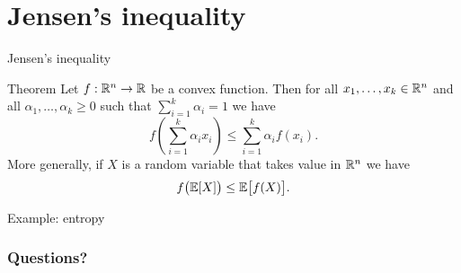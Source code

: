 \documentclass{beamer}
\begin{document}
\section{Jensen's inequality}


\begin{frame}[t]{Jensen's inequality}
	\grid

	\vspace{-0.4cm}

	\begin{block}{Theorem}
	Let $f: \mathbb{R}^n \to \mathbb{R}$ be a convex function. Then for all $x_1, \dots, x_k \in \mathbb{R}^n$ and all $\alpha_1, \dots, \alpha_k \geq 0$ such that $\sum_{i=1}^k \alpha_i = 1$ we have
	$$
	f\left(\sum_{i=1}^k \alpha_i x_i \right) \leq \sum_{i=1}^k \alpha_i f(x_i).
	$$
	More generally, if $X$ is a random variable that takes value in $\mathbb{R}^n$ we have
	$$
	f\big(\mathbb{E} [X]\big) \leq \mathbb{E} \big[f(X)\big].
	$$
	\end{block}

\end{frame}


\begin{frame}[t]{Example: entropy}
	\grid

	\pause
\end{frame}



\appendix
\backupbegin
\begin{frame}[t]
	\frametitle{Questions?}
	\grid

	\pause
\end{frame}
\backupend
\end{document}
